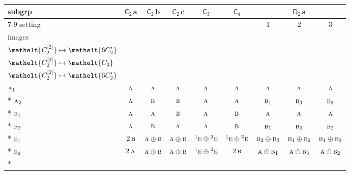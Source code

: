\documentclass[10pt,a4paper]{article}
\numberwithin{equation}{section}
\newcommand{\eltfont}[1]{{\let\sigma\eltsigma\mathelt{#1}}}
\newcommand{\grp}[1]{\mathsf{#1}}
\newcommand{\irr}[1]{\text{\normalfont\scshape #1}}
\newcommand{\conjpair}[1]{{}^{#1}}
\newcommand{\cls}[1]{\eltfont{#1}}
\newcommand{\clsletter}[1]{\,{\scriptsize\color{black!55}#1}}
\newcommand{\genidx}[2]{#1^{[\mathrm{#2}]}}
\begin{document}
{\small\begin{longtable}{@{}lcccccccc@{}}\toprule
subgrp & \href{C2.pdf}{$\grp{C_{2}}$}\clsletter{a} & \href{C2.pdf}{$\grp{C_{2}}$}\clsletter{b} & \href{C2.pdf}{$\grp{C_{2}}$}\clsletter{c} & \href{C3.pdf}{$\grp{C_{3}}$} & \href{C4.pdf}{$\grp{C_{4}}$} & \multicolumn{3}{c}{\href{D2.pdf}{$\grp{D_{2}}$}\clsletter{a}}\\\cmidrule(lr){7-9}
setting &  &  &  &  &  & 1 & 2 & 3\\
images &  &  &  &  &  & {\scriptsize\begin{tabular}[t]{@{}c@{}}$\cls{\genidx{C_{2}}{1}} \mapsto \cls{C_{2}}$\\$\cls{\genidx{C_{2}}{2}} \mapsto \cls{6C_{2}'}$\end{tabular}} & {\scriptsize\begin{tabular}[t]{@{}c@{}}$\cls{\genidx{C_{2}}{1}} \mapsto \cls{6C_{2}'}$\\$\cls{\genidx{C_{2}}{2}} \mapsto \cls{C_{2}}$\end{tabular}} & {\scriptsize\begin{tabular}[t]{@{}c@{}}$\cls{\genidx{C_{2}}{1}} \mapsto \cls{6C_{2}'}$\\$\cls{\genidx{C_{2}}{2}} \mapsto \cls{6C_{2}'}$\end{tabular}}\\\midrule\endhead
\bottomrule\endfoot\endlastfoot
$\irr{a}_{1}$ & $\irr{a}$ & $\irr{a}$ & $\irr{a}$ & $\irr{a}$ & $\irr{a}$ & $\irr{a}$ & $\irr{a}$ & $\irr{a}$\\*
$\irr{a}_{2}$ & $\irr{a}$ & $\irr{b}$ & $\irr{b}$ & $\irr{a}$ & $\irr{a}$ & $\irr{b}_{1}$ & $\irr{b}_{3}$ & $\irr{b}_{2}$\\*
$\irr{b}_{1}$ & $\irr{a}$ & $\irr{a}$ & $\irr{b}$ & $\irr{a}$ & $\irr{b}$ & $\irr{a}$ & $\irr{a}$ & $\irr{a}$\\*
$\irr{b}_{2}$ & $\irr{a}$ & $\irr{b}$ & $\irr{a}$ & $\irr{a}$ & $\irr{b}$ & $\irr{b}_{1}$ & $\irr{b}_{3}$ & $\irr{b}_{2}$\\*
$\irr{e}_{1}$ & $2\,\irr{b}$ & $\irr{a}\oplus \irr{b}$ & $\irr{a}\oplus \irr{b}$ & $\conjpair{1}\irr{e}\oplus \conjpair{2}\irr{e}$ & $\conjpair{1}\irr{e}\oplus \conjpair{2}\irr{e}$ & $\irr{b}_{2}\oplus \irr{b}_{3}$ & $\irr{b}_{1}\oplus \irr{b}_{2}$ & $\irr{b}_{1}\oplus \irr{b}_{3}$\\*
$\irr{e}_{2}$ & $2\,\irr{a}$ & $\irr{a}\oplus \irr{b}$ & $\irr{a}\oplus \irr{b}$ & $\conjpair{1}\irr{e}\oplus \conjpair{2}\irr{e}$ & $2\,\irr{b}$ & $\irr{a}\oplus \irr{b}_{1}$ & $\irr{a}\oplus \irr{b}_{3}$ & $\irr{a}\oplus \irr{b}_{2}$\\*

\end{longtable}}
\end{document}
